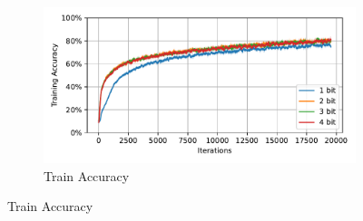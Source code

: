     \label{appendix:accuracy_curves_cifar10}
        \begin{figure}[H]
            \centering
            \begin{subfigure}[H]{\textwidth}
                \centering
                \includegraphics[width=\textwidth]{../standard/CIFAR10/plots/cifar10_train_acc.pdf}
                \caption{Train Accuracy}
            \end{subfigure}
        \end{figure}
